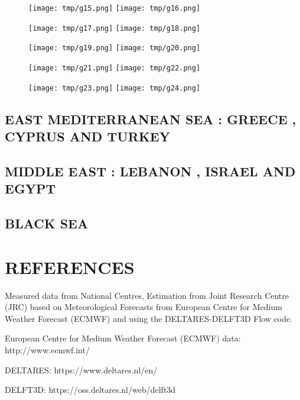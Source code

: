 \documentclass[a4paper]{article}
\renewcommand{\\}{\ {\large\textperiodcentered}\ }
\renewcommand{\\}{\ {\large\textperiodcentered}\ }
\begin{document}
\begin{figure}[h]
\centerline{
\texttt{[image: tmp/g15.png]}
\texttt{[image: tmp/g16.png]}
}
\end{figure}
\begin{figure}[h]
\centerline{
\texttt{[image: tmp/g17.png]}
\texttt{[image: tmp/g18.png]}
}
\end{figure}

\begin{figure}[h]
\centerline{
\texttt{[image: tmp/g19.png]}
\texttt{[image: tmp/g20.png]}
}
\end{figure}
\begin{figure}[h]
\centerline{
\texttt{[image: tmp/g21.png]}
\texttt{[image: tmp/g22.png]}
}
\end{figure}

\begin{figure}[h]
\centerline{
\texttt{[image: tmp/g23.png]}
\texttt{[image: tmp/g24.png]}
}
\end{figure}

\clearpage

\subsection*{EAST MEDITERRANEAN SEA : GREECE , CYPRUS AND TURKEY}

\newpage
\subsection*{MIDDLE EAST : LEBANON , ISRAEL AND EGYPT}

\newpage
\subsection*{BLACK SEA}


\newpage
\section*{REFERENCES}

Measured data from National Centres, Estimation from Joint Research Centre (JRC) based on Meteorological Forecasts from European Centre for Medium Weather Forecast (ECMWF) and using the DELTARES-DELFT3D Flow code.

European Centre for Medium Weather Forecast (ECMWF) data: http://www.ecmwf.int/

DELTARES: https://www.deltares.nl/en/

DELFT3D: https://oss.deltares.nl/web/delft3d
\end{document}
